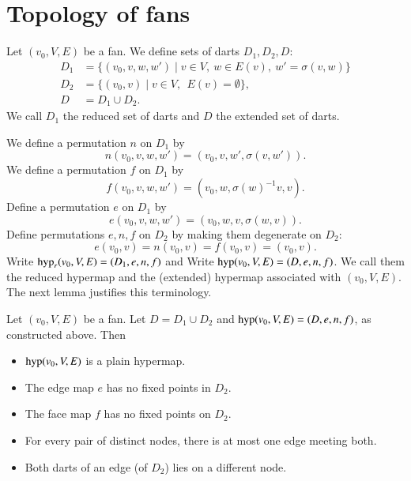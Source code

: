 \section{Topology of fans}

Let $(v_0,V,E)$ be a fan.  We define sets of darts $D_1,D_2,D$:
    $$
    \begin{array}{lll}
    D_1 &= \{(v_0,v,w,w')\mid v\in V,\ w\in E(v),\ w' = \sigma(v,w)\}\\
    D_2 &= \{(v_0,v) \mid v\in V,\ \ E(v) = \emptyset\},\\
    D   &= D_1\cup D_2.
    \end{array}
    $$
We call $D_1$ the reduced set of darts and $D$ the extended set of darts.

We define a permutation $n$ on $D_1$ by
    $$n(v_0,v,w,w') = (v_0,v,w',\sigma(v,w')).$$
We define a permutation $f$ on $D_1$ by
    $$
    f (v_0,v,w,w') = (v_0,w,\sigma(w)^{-1} v,v).
    $$
Define a permutation $e$ on $D_1$ by
    $$
    e (v_0,v,w,w') = (v_0,w,v,\sigma(w,v)).
    $$
Define permutations $e,n,f$ on $D_2$ by making them degenerate on $D_2$:
    $$
    e (v_0,v) = n(v_0,v) = f(v_0,v) = (v_0,v).
    $$
Write ${\operatorname{hyp}}_r(v_0,V,E)=(D_1,e,n,f)$ and
Write ${\operatorname{hyp}}(v_0,V,E)=(D,e,n,f)$.  We call them the reduced hypermap
and the (extended) hypermap associated with $(v_0,V,E)$.  The next
lemma justifies this terminology.



\begin{lemma} Let $(v_0,V,E)$ be a fan.  Let $D = D_1\cup D_2$
and ${\operatorname{hyp}}(v_0,V,E) = (D,e,n,f)$, as constructed above.  Then
    \begin{itemize}
    \item ${\operatorname{hyp}}(v_0,V,E)$ is a plain hypermap.
    \item The edge map $e$ has no fixed
points in $D_2$.
    \item The face map $f$ has no fixed points on $D_2$.
    \item For every pair of distinct nodes, there is at most one
    edge meeting both.
    \item Both darts of an edge (of $D_2$) lies on a different node.
    \end{itemize}
\end{lemma}

